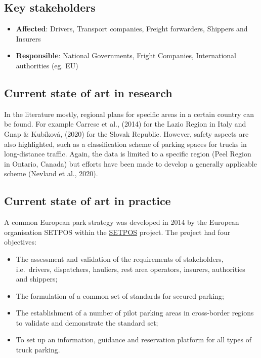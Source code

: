 \documentclass[
]{book}
\providecommand{\tightlist}{%
  \setlength{\itemsep}{0pt}\setlength{\parskip}{0pt}}
\begin{document}
\hypertarget{key-stakeholders-20}{%
\subsection*{Key stakeholders}\label{key-stakeholders-20}}

\begin{itemize}
\tightlist
\item
  \textbf{Affected}: Drivers, Transport companies, Freight forwarders, Shippers and Insurers
\item
  \textbf{Responsible}: National Governments, Fright Companies, International authorities (eg. EU)
\end{itemize}

\hypertarget{current-state-of-art-in-research-20}{%
\subsection*{Current state of art in research}\label{current-state-of-art-in-research-20}}

In the literature mostly, regional plans for specific areas in a certain country can be found. For example Carrese et al., (2014) for the Lazio Region in Italy and Gnap \& Kubíková, (2020) for the Slovak Republic. However, safety aspects are also highlighted, such as a classification scheme of parking spaces for trucks in long-distance traffic. Again, the data is limited to a specific region (Peel Region in Ontario, Canada) but efforts have been made to develop a generally applicable scheme (Nevland et al., 2020).

\hypertarget{current-state-of-art-in-practice-19}{%
\subsection*{Current state of art in practice}\label{current-state-of-art-in-practice-19}}

A common European park strategy was developed in 2014 by the European organisation SETPOS within the \href{https://ec.europa.eu/transport/sites/transport/files/modes/road/parking/doc/2010_04_28_setpos_project_handbook.pdf}{SETPOS} project. The project had four objectives:

\begin{itemize}
\tightlist
\item
  The assessment and validation of the requirements of stakeholders, i.e.~drivers, dispatchers, hauliers, rest area operators, insurers, authorities and shippers;
\item
  The formulation of a common set of standards for secured parking;
\item
  The establishment of a number of pilot parking areas in cross-border regions to validate and demonstrate the standard set;
\item
  To set up an information, guidance and reservation platform for all types of truck parking.
\end{itemize}
\end{document}
